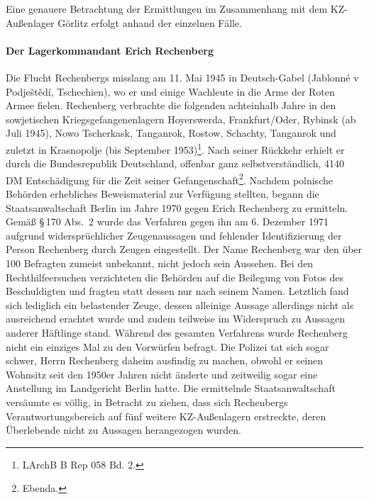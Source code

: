 Eine genauere Betrachtung der Ermittlungen im Zusammenhang mit dem KZ-Außenlager Görlitz erfolgt anhand der einzelnen Fälle. 

\newpage
\paragraph{Der Lagerkommandant Erich Rechenberg\label{rechenberg_ahndung}}
Die Flucht Rechenbergs misslang am 11. Mai 1945 in Deutsch-Gabel (Jablonné v Podještědí, Tschechien), wo er und einige Wachleute in die Arme der Roten Armee fielen. Rechenberg
verbrachte die folgenden achteinhalb Jahre in den sowjetischen Kriegsgefangenenlagern
Hoyerswerda, Frankfurt/Oder, Rybinsk (ab Juli 1945), Nowo Tscherkask, Tanganrok, Rostow, Schachty, Tanganrok und zuletzt in Krasnopolje (bis September 1953)\footnote{LArchB B Rep 058 Bd. 2.}. Nach
seiner Rückkehr erhielt er durch die Bundesrepublik Deutschland, offenbar ganz selbstverständlich, 4140 DM Entschädigung für die Zeit seiner Gefangenschaft\footnote{Ebenda.}.
\newline
Nachdem polnische Behörden erhebliches Beweismaterial zur Verfügung stellten, begann die Staatsanwaltschaft Berlin im Jahre 1970 gegen Erich Rechenberg zu ermitteln.
Gemäß \S\,170 Abs.~2 wurde das Verfahren gegen ihn am 6. Dezember 1971 aufgrund widersprüchlicher Zeugenaussagen und fehlender Identifizierung der Person Rechenberg durch Zeugen eingestellt. Der Name Rechenberg war den über 100 Befragten zumeist unbekannt, nicht jedoch sein Aussehen. Bei den Rechthilfeersuchen verzichteten die Behörden auf die Beilegung von Fotos des Beschuldigten und fragten statt dessen nur nach seinem Namen. Letztlich fand sich lediglich ein belastender Zeuge, dessen alleinige Aussage allerdings nicht als ausreichend erachtet wurde und zudem teilweise im Widerspruch zu Aussagen anderer Häftlinge stand. Während des gesamten Verfahrens wurde Rechenberg nicht ein einziges Mal zu den Vorwürfen befragt. Die Polizei tat sich sogar schwer, Herrn Rechenberg daheim ausfindig zu machen, obwohl er seinen Wohnsitz seit den 1950er Jahren nicht änderte und zeitweilig sogar eine Anstellung im Landgericht Berlin hatte. Die ermittelnde Staatsanwaltschaft versäumte es völlig, in Betracht zu ziehen, dass sich Rechenbergs Verantwortungsbereich auf fünf weitere KZ-Außenlagern erstreckte, deren Überlebende nicht zu Aussagen herangezogen wurden.

